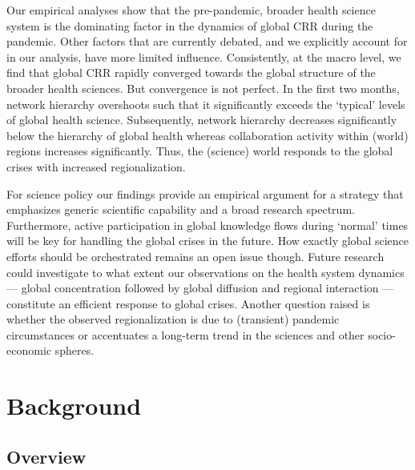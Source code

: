 Our empirical analyses show that the pre-pandemic, broader health science system is the dominating factor in the dynamics of global CRR during the pandemic. Other factors that are currently debated, and we explicitly account for in our analysis, have more limited influence. Consistently, at the macro level, we find that global CRR rapidly converged towards the global structure of the broader health sciences. But convergence is not perfect. In the first two months, network hierarchy overshoots such that it significantly exceeds the `typical' levels of global health science. Subsequently, network hierarchy decreases significantly below the hierarchy of global health whereas collaboration activity within (world) regions increases significantly. Thus, the (science) world responds to the global crises with increased regionalization.

For science policy our findings provide an empirical argument for a strategy that emphasizes generic scientific capability and a broad research spectrum. Furthermore, active participation in global knowledge flows during `normal' times will be key for handling the global crises in the future. How exactly global science efforts should be orchestrated remains an open issue though. Future research could investigate to what extent our observations on the health system dynamics --- global concentration followed by global diffusion and regional interaction --- constitute an efficient response to global crises. Another question raised is whether the observed regionalization is due to (transient) pandemic circumstances or accentuates a long-term trend in the sciences and other socio-economic spheres. 


\section{Background}

\subsection{Overview}

